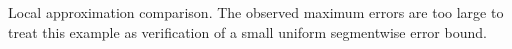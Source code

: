 \begin{table}[!htbp]
\centering
\scriptsize
\resizebox{0.97\textwidth}{!}{}
\caption{Local approximation comparison. The observed maximum errors are too large to treat this example as verification of a small uniform segmentwise error bound.}
\label{tab:nonconjugate-result-paper}
\end{table}
